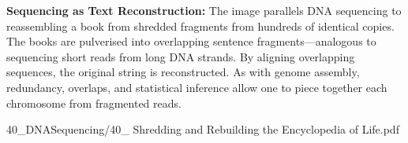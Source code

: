 \begin{SideNotePage}{
  \textbf{Sequencing as Text Reconstruction:}  
  The image parallels DNA sequencing to reassembling a book from shredded fragments from hundreds of identical copies. The books are pulverised into overlapping sentence fragments—analogous to sequencing short reads from long DNA strands. By aligning overlapping sequences, the original string is reconstructed. As with genome assembly, redundancy, overlaps, and statistical inference allow one to piece together each chromosome from fragmented reads. \par
}{40_DNASequencing/40_ Shredding and Rebuilding the Encyclopedia of Life.pdf}
\end{SideNotePage}
